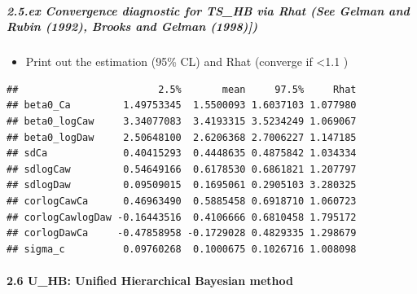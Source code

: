 \documentclass[
]{article}
\newenvironment{Shaded}{\begin{snugshade}}{\end{snugshade}}
\newcommand{\FunctionTok}[1]{\textcolor[rgb]{0.00,0.00,0.00}{#1}}
\newcommand{\NormalTok}[1]{#1}
\newcommand{\SpecialCharTok}[1]{\textcolor[rgb]{0.00,0.00,0.00}{#1}}
\newcommand{\StringTok}[1]{\textcolor[rgb]{0.31,0.60,0.02}{#1}}
\providecommand{\tightlist}{%
  \setlength{\itemsep}{0pt}\setlength{\parskip}{0pt}}
\begin{document}
\hypertarget{ex-convergence-diagnostic-for-ts_hb-via-rhat-see-gelman-and-rubin-1992-brooks-and-gelman-1998}{%
\subparagraph{2.5.ex Convergence diagnostic for TS\_HB via Rhat (See
Gelman and Rubin (1992), Brooks and Gelman
(1998){]})}\label{ex-convergence-diagnostic-for-ts_hb-via-rhat-see-gelman-and-rubin-1992-brooks-and-gelman-1998}}

\begin{itemize}
\tightlist
\item
  Print out the estimation (95\% CL) and Rhat (converge if \textless1.1
  )
\end{itemize}

\begin{Shaded}
\end{Shaded}

\begin{verbatim}
##                        2.5%       mean     97.5%     Rhat
## beta0_Ca         1.49753345  1.5500093 1.6037103 1.077980
## beta0_logCaw     3.34077083  3.4193315 3.5234249 1.069067
## beta0_logDaw     2.50648100  2.6206368 2.7006227 1.147185
## sdCa             0.40415293  0.4448635 0.4875842 1.034334
## sdlogCaw         0.54649166  0.6178530 0.6861821 1.207797
## sdlogDaw         0.09509015  0.1695061 0.2905103 3.280325
## corlogCawCa      0.46963490  0.5885458 0.6918710 1.060723
## corlogCawlogDaw -0.16443516  0.4106666 0.6810458 1.795172
## corlogDawCa     -0.47858958 -0.1729028 0.4829335 1.298679
## sigma_c          0.09760268  0.1000675 0.1026716 1.008098
\end{verbatim}

\hypertarget{u_hb-unified-hierarchical-bayesian-method}{%
\paragraph{2.6 U\_HB: Unified Hierarchical Bayesian
method}\label{u_hb-unified-hierarchical-bayesian-method}}
\end{document}

